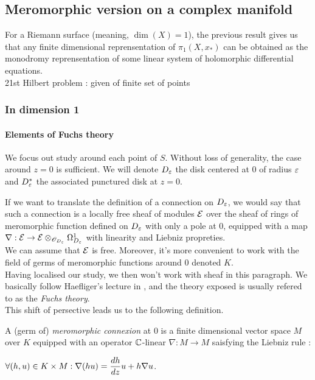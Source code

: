 \subsection{Meromorphic version on a complex manifold}

For a Riemann surface (meaning, $\dim(X) =1$), the previous result gives us that any finite dimensional reprensentation of $\pi_1(X,x_*)$ can be obtained as the monodromy reprensentation of some linear system of holomorphic differential equations.\\


21st Hilbert problem : given of finite set of points 

\subsubsection{In dimension 1}

\paragraph{Elements of Fuchs theory}

We focus out study around each point of $S$. Without loss of generality, the case around $z=0$ is sufficient.
We will denote $D_\varepsilon$ the disk centered at 0 of radius $\varepsilon$ and $D_\varepsilon^*$ the associated punctured disk at $z=0$.

\medskip
If we want to translate the definition of a connection on $D_\varepsilon$, we would say that such a connection is a locally free sheaf of modules $\mathcal{E}$ over the sheaf of rings of meromorphic function defined on $D_\varepsilon$ with only a pole at $0$, equipped with a map $\nabla : \mathcal{E} \to \mathcal{E} \otimes_{\mathscr{O}_{D_\varepsilon}} \Omega^1_{D_\varepsilon}$ with linearity and Liebniz propreties.\\
We can assume that $\mathcal{E}$ is free. Moreover, it's more convenient to work with the field of germs of meromorphic functions around 0 denoted $K$. \\
Having localised our study, we then won't work with sheaf in this paragraph. We basically follow Haefliger's lecture in \cite{borel_dmodules}, and the theory exposed is usually refered to as the \textit{Fuchs theory}.\\
This shift of persective leads us to the following definition.

\begin{mydef}
A (germ of) \textit{meromorphic connexion} at 0 is a finite dimensional vector space $M$ over $K$ equipped with an operator $\mathbb{C}$-linear $\nabla : M \to M$ saisfying the Liebniz rule :
\begin{center}
$\displaystyle \forall (h,u) \in K \times M : \nabla(hu)  = \frac{dh}{dz}u + h \nabla u$.
\end{center}
\end{mydef}


